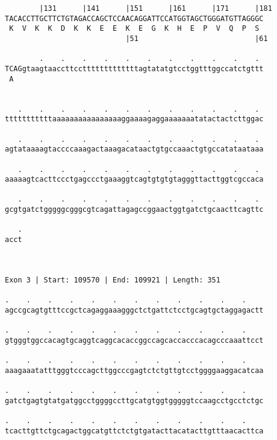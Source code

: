\documentclass{article}
\begin{document}
\begin{Verbatim}
        |131      |141      |151      |161      |171      |181
TACACCTTGCTTCTGTAGACCAGCTCCAACAGGATTCCATGGTAGCTGGGATGTTAGGGC
 K  V  K  K  D  K  K  E  E  K  E  G  K  H  E  P  V  Q  P  S 
                            |51                           |61
  
        .    .    .    .    .    .    .    .    .    .    . 
TCAGgtaagtaaccttcctttttttttttttagtatatgtcctggtttggccatctgttt
 A                                                          
                                                            
  
   .    .    .    .    .    .    .    .    .    .    .    . 
tttttttttttaaaaaaaaaaaaaaaaggaaaagaggaaaaaaatatactactcttggac
                                                            
   .    .    .    .    .    .    .    .    .    .    .    . 
agtataaaagtaccccaaagactaaagacataactgtgccaaactgtgccatataataaa
                                                            
   .    .    .    .    .    .    .    .    .    .    .    . 
aaaaagtcacttccctgagccctgaaaggtcagtgtgtgtagggttacttggtcgccaca
                                                            
   .    .    .    .    .    .    .    .    .    .    .    . 
gcgtgatctgggggcgggcgtcagattagagccggaactggtgatctgcaacttcagttc
                                                            
   .
acct
    
    
 
Exon 3 | Start: 109570 | End: 109921 | Length: 351
 
.    .    .    .    .    .    .    .    .    .    .    .    
agccgcagtgtttccgctcagaggaaagggctctgattctcctgcagtgctaggagactt
                                                            
.    .    .    .    .    .    .    .    .    .    .    .    
gtgggtggccacagtgcaggtcaggcacaccggccagcaccacccacagcccaaattcct
                                                            
.    .    .    .    .    .    .    .    .    .    .    .    
aaagaaatatttgggtcccagcttggcccgagtctctgttgtcctggggaaggacatcaa
                                                            
.    .    .    .    .    .    .    .    .    .    .    .    
gatctgagtgtatgatggcctggggccttgcatgtggtgggggtccaagcctgcctctgc
                                                            
.    .    .    .    .    .    .    .    .    .    .    .    
tcacttgttctgcagactggcatgttctctgtgatacttacatacttgtttaacacttca
                                                            

\end{Verbatim}
\end{document}
